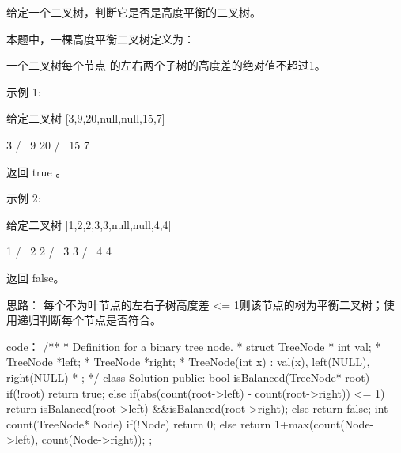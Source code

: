 给定一个二叉树，判断它是否是高度平衡的二叉树。

本题中，一棵高度平衡二叉树定义为：

    一个二叉树每个节点 的左右两个子树的高度差的绝对值不超过1。

示例 1:

给定二叉树 [3,9,20,null,null,15,7]

    3
   / \
  9  20
    /  \
   15   7

返回 true 。

示例 2:

给定二叉树 [1,2,2,3,3,null,null,4,4]

       1
      / \
     2   2
    / \
   3   3
  / \
 4   4

返回 false。




























思路：
每个不为叶节点的左右子树高度差 <= 1则该节点的树为平衡二叉树；使用递归判断每个节点是否符合。




























code：
/**
 * Definition for a binary tree node.
 * struct TreeNode {
 *     int val;
 *     TreeNode *left;
 *     TreeNode *right;
 *     TreeNode(int x) : val(x), left(NULL), right(NULL) {}
 * };
 */
class Solution {
public:
    bool isBalanced(TreeNode* root) {
        if(!root) return true;
        else if(abs(count(root->left) - count(root->right)) <= 1)
            return isBalanced(root->left) &&isBalanced(root->right);
        else return false;
    }
    int count(TreeNode* Node)
    {
        if(!Node) return 0;
        else return 1+max(count(Node->left), count(Node->right));
    }
};